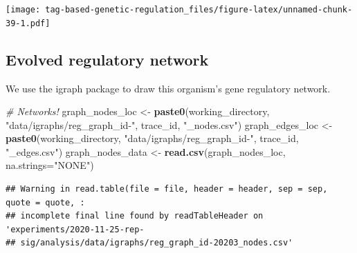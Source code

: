 \documentclass[
]{book}
\newenvironment{Shaded}{\begin{snugshade}}{\end{snugshade}}
\newcommand{\CommentTok}[1]{\textcolor[rgb]{0.56,0.35,0.01}{\textit{#1}}}
\newcommand{\DataTypeTok}[1]{\textcolor[rgb]{0.13,0.29,0.53}{#1}}
\newcommand{\KeywordTok}[1]{\textcolor[rgb]{0.13,0.29,0.53}{\textbf{#1}}}
\newcommand{\NormalTok}[1]{#1}
\newcommand{\StringTok}[1]{\textcolor[rgb]{0.31,0.60,0.02}{#1}}
\begin{document}
\texttt{[image: tag-based-genetic-regulation\_files/figure-latex/unnamed-chunk-39-1.pdf]}

\hypertarget{evolved-regulatory-network}{%
\subsection{Evolved regulatory network}\label{evolved-regulatory-network}}

We use the igraph package to draw this organism's gene regulatory network.

\begin{Shaded}
\begin{Highlighting}[]
\CommentTok{\# Networks!}
\NormalTok{graph\_nodes\_loc \textless{}{-}}\StringTok{ }\KeywordTok{paste0}\NormalTok{(working\_directory, }\StringTok{"data/igraphs/reg\_graph\_id{-}"}\NormalTok{, trace\_id, }\StringTok{"\_nodes.csv"}\NormalTok{)}
\NormalTok{graph\_edges\_loc \textless{}{-}}\StringTok{ }\KeywordTok{paste0}\NormalTok{(working\_directory, }\StringTok{"data/igraphs/reg\_graph\_id{-}"}\NormalTok{, trace\_id, }\StringTok{"\_edges.csv"}\NormalTok{)}
\NormalTok{graph\_nodes\_data \textless{}{-}}\StringTok{ }\KeywordTok{read.csv}\NormalTok{(graph\_nodes\_loc, }\DataTypeTok{na.strings=}\StringTok{"NONE"}\NormalTok{)}
\end{Highlighting}
\end{Shaded}

\begin{verbatim}
## Warning in read.table(file = file, header = header, sep = sep, quote = quote, :
## incomplete final line found by readTableHeader on 'experiments/2020-11-25-rep-
## sig/analysis/data/igraphs/reg_graph_id-20203_nodes.csv'
\end{verbatim}
\end{document}
